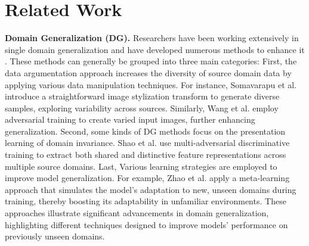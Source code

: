 \section{Related Work}
\label{sec:Work}

\textbf{Domain Generalization (DG).} Researchers have been working extensively in single domain generalization and have developed numerous methods to enhance it \cite{dou2019domain, liu2024unbiased, li2024prompt, wu2024g, zhou2022domain}. These methods can generally be grouped into three main categories: First, the data argumentation approach \cite{kang2022style,lee2022wildnet,li2023deep,somavarapu2020frustratingly} increases the diversity of source domain data by applying various data manipulation techniques. For instance, Somavarapu et al. \cite{somavarapu2020frustratingly} introduce a straightforward image stylization transform to generate diverse samples, exploring variability across sources. Similarly, Wang et al. \cite{wang2021learning} employ adversarial training to create varied input images, further enhancing generalization. Second, some kinds of DG methods focus on the presentation learning of domain invariance. Shao et al. \cite{shao2019multi} use multi-adversarial discriminative training to extract both shared and distinctive feature representations across multiple source domains. Last, Various learning strategies \cite{chen2023meta,du2020learning,peng2022semantic,seo2020learning,wang2023improving,zhao2021learning} are employed to improve model generalization. For example, Zhao et al. \cite{zhao2021learning} apply a meta-learning approach that simulates the model’s adaptation to new, unseen domains during training, thereby boosting its adaptability in unfamiliar environments. These approaches illustrate significant advancements in domain generalization, highlighting different techniques designed to improve models' performance on previously unseen domains.

